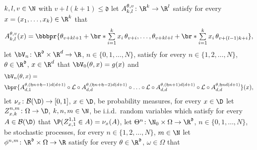 \begin{algo}
		$k, l, v \in \N $
		with
			$v + l (k + 1 ) \leq \mathfrak{d}$
	let
		$ A^{ \theta, v }_{ k, l } \colon \R^k \to \R^l $
	satisfy 
		for every
			$ x = ( x_1, \dots, x_k )\in\R^k $ 
		that
		\begin{equation}\label{eq:layerA}
			A^{ \theta, v }_{ k, l }( x ) 
			= 
			\bbbpr{
				\theta_{v+kl+1}+ \br*{\textstyle\sum\limits_{i=1}^ k x_i\, \theta_{v+i}}, 
				\dots, 
				\theta_{v+kl+l} + \br*{\textstyle\sum\limits_{i=1}^ k x_i\, \theta_{v+(l-1)k+i}} 
			}
			,
		\end{equation}	%
	let
		$\bV_n\colon\R^{\mathfrak{d}}\times\R^d\to\R$, $n\in\{0,1,\ldots,N\}$,
	satisfy 
		for every
			$n\in\{1,2,\ldots,N\}$, 
			$\theta \in \R^{\mathfrak{d}}$, 
			$x \in \R^d$
		that
			$\bV_0(\theta,x) = g(x)$ and
			\begin{align}
				\label{eq:neural_network_for_a_generalCase}
				& \bV_{ n }(\theta,x)
				= \\
				& \bpr{A^{ \theta, (\mathfrak{h}n+\mathfrak{h}-1)d(d+1) }_{ d, 1 }
				\circ
				\mathcal{L}
				\circ
				A^{ \theta, (\mathfrak{h}n+\mathfrak{h}-2)d(d+1) }_{ d, d }
				\circ
				\ldots
				\circ
				\mathcal{L}
				\circ
				A^{ \theta, (\mathfrak{h}n+1)d(d+1) }_{ d, d }
				\circ
				\mathcal{L}
				\circ
				A^{ \theta, \mathfrak{h}nd(d+1) }_{ d, d }}(x)
				, \nonumber
			\end{align}
	let
		$\nu_x \colon \mathcal{B}( \D )\to [0,1]$,
		$x \in \D$,
		be probability measures, 
	for every
		$x \in \D$
	let
		$Z^{ n, m }_{ x, k } \colon \Omega \to \D$,
		$k, n, m \in \N$,
		be i.i.d.\ random variables 
		which satisfy 
			for every
				$ A \in \mathcal{B}( \D ) $
			that
				$\P( Z_{ x, 1 }^{ 1, 1 } \in A ) = \nu_x( A )$,
	let
		$\Theta^{n}\colon \N_0\times\Omega\to\R^{\mathfrak{d}}$, $n \in \{0,1,\ldots,N\}$,
		be stochastic processes,
	for every 
		$n \in \{1,2,\ldots,N\}$, 
		$m\in \N$
	let
		$\phi^{n,m}\colon\R^{\mathfrak{d}}\times\Omega\to\R$
	satisfy 
		for every
			$\theta\in\R^{\mathfrak{d}}$, $\omega\in\Omega$
		that
		\begin{equation}
		\label{eq:loss_special_case}
		\begin{split}

\end{split}
\end{equation}
\end{algo}
